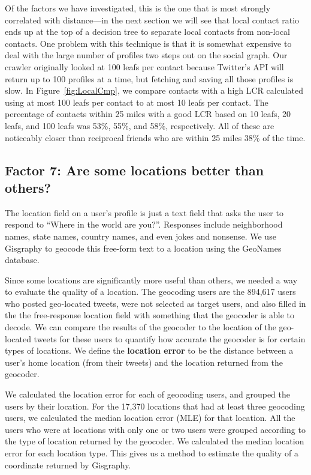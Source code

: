 \documentclass[letterpaper]{article}
\begin{document}
Of the factors we have investigated, this is the one that is most strongly
correlated with distance---in the next section we will see that local contact
ratio ends up at the top of a decision tree to separate local contacts from
non-local contacts.
%
One problem with this technique is that it is somewhat expensive to deal with
the large number of profiles two steps out on the social graph.
%
Our crawler originally looked at 100 leafs per contact because Twitter's API
will return up to 100 profiles at a time, but fetching and saving all those
profiles is slow.
%
In Figure~\ref{fig:LocalCmp}, we compare contacts with a high LCR calculated
using at most 100 leafs per contact to at most 10 leafs per contact.
%
The percentage of contacts within 25 miles with a good LCR based on 10 leafs,
20 leafs, and 100 leafs was 53\%, 55\%, and 58\%, respectively.
%
All of these are noticeably closer than reciprocal friends who are within 25
miles 38\% of the time.


\subsection{Factor 7: Are some locations better than others?}
The location field on a user's profile is just a text field that asks the user
to respond to ``Where in the world are you?''.
%
Responses include neighborhood names, state names, country names, and even
jokes and nonsense.
%
We use Gisgraphy
to geocode this free-form text to a location using the GeoNames database.

Since some locations are significantly more useful than others, we needed a way
to evaluate the quality of a location.
%
The geocoding users are the 894,617 users who posted geo-located tweets, were not
selected as target users, and also filled in the the free-response location
field with something that the geocoder is able to decode.
%
We can compare the results of the geocoder to the location of the geo-located
tweets for these users to quantify how accurate the geocoder is for certain
types of locations.
%
We define the \textbf{location error} to be the distance between a user's home
location (from their tweets) and the location returned from the geocoder.

We calculated the location error for each of geocoding users, and grouped the
users by their location.
%
For the 17,370 locations that had at least three geocoding users, we calculated
the median location error (MLE) for that location.
%
All the users who were at locations with only one or two users were grouped
according to the type of location returned by the geocoder.
%
We calculated the median location error for each location type.
%
%
%
This gives us a method to estimate the quality of a coordinate returned by
Gisgraphy.
\end{document}
